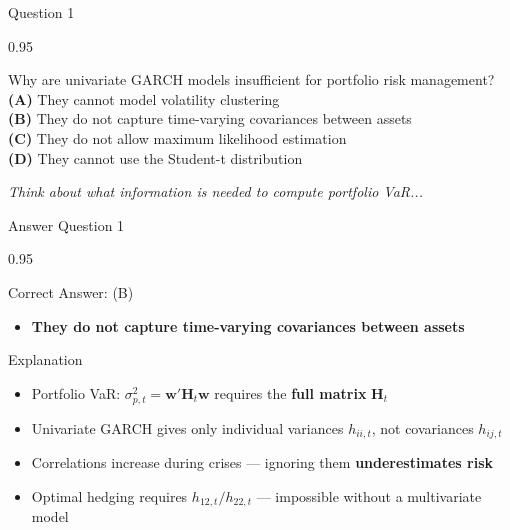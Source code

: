 \documentclass[9pt, aspectratio=169, t]{beamer}
\begin{document}
\begin{frame}{Question 1}
    \begin{cminipage}{0.95\textwidth}
    \begin{block}{Why are univariate GARCH models insufficient for portfolio risk management?}
        \textcolor{MainBlue}{\textbf{(A)}} They cannot model volatility clustering\\[3pt]
        \textcolor{MainBlue}{\textbf{(B)}} They do not capture time-varying covariances between assets\\[3pt]
        \textcolor{MainBlue}{\textbf{(C)}} They do not allow maximum likelihood estimation\\[3pt]
        \textcolor{MainBlue}{\textbf{(D)}} They cannot use the Student-t distribution
    \end{block}

    \vspace{0.5cm}

    \begin{center}
        \textit{Think about what information is needed to compute portfolio VaR...}
    \end{center}
    \end{cminipage}
\end{frame}

\begin{frame}{Answer Question 1}
    \begin{cminipage}{0.95\textwidth}
    \begin{exampleblock}{Correct Answer: (B)}
        \begin{itemize}\setlength{\itemsep}{0pt}
            \item \textbf{They do not capture time-varying covariances between assets}
        \end{itemize}
    \end{exampleblock}

    \pause
    \begin{block}{Explanation}
        \begin{itemize}\setlength{\itemsep}{0pt}
            \item Portfolio VaR: $\sigma_{p,t}^2 = \mathbf{w}'\mathbf{H}_t\mathbf{w}$ requires the \textbf{full matrix} $\mathbf{H}_t$
            \item Univariate GARCH gives only individual variances $h_{ii,t}$, not covariances $h_{ij,t}$
            \item Correlations increase during crises --- ignoring them \textbf{underestimates risk}
            \item Optimal hedging requires $h_{12,t}/h_{22,t}$ --- impossible without a multivariate model
        \end{itemize}
    \end{block}
    \end{cminipage}
\end{frame}
\end{document}
